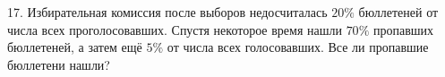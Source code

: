 17. Избирательная комиссия после выборов недосчиталась $20\%$ бюллетеней от числа всех
проголосовавших. Спустя некоторое время нашли $70\%$ пропавших бюллетеней, а затем
ещё $5\%$ от числа всех голосовавших. Все ли пропавшие бюллетени нашли?\\
